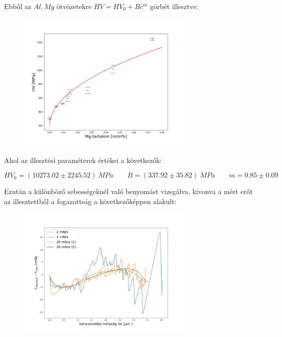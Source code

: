 \documentclass[a4paper,12pt]{article}
\begin{document}
\par Ebből az $Al, Mg$ ötvözetekre $HV = HV_{0} + Bc^{m}$ görbét illesztve:

\begin{figure}[H]
\centering
\includegraphics[width=0.75\textwidth]{./adatok/HV_illeszt.png}
\end{figure}

\par Ahol az illesztési paraméterek értékei a következők:

\begin{equation*}
 HV_0=(10273.02\pm2245.52)~MPa \quad \quad
 B = (337.92\pm35.82)~MPa \quad \quad
 m = 0.85\pm0.09
\end{equation*}

\par Ezután a különböző sebességeknél való benyomást vizsgálva, kivonva a mért erőt az illesztettből a fogazottság a következőképpen alakult:

\begin{figure}[H]
\centering
\includegraphics[width=0.75\textwidth]{./adatok/feladat3.png}
\end{figure}
\end{document}
